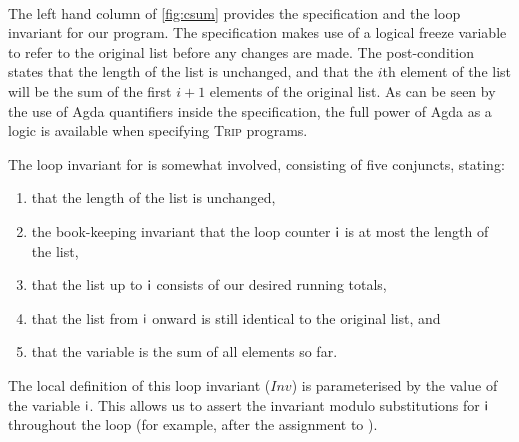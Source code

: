 \documentclass[sigplan]{acmart}%
\begin{document}
\begin{code}
\>[2]\AgdaOperator{\AgdaFunction{\AgdaUnderscore{}[\AgdaUnderscore{}]=\AgdaUnderscore{}}}\AgdaSpace{}%
\AgdaSymbol{:}\AgdaSpace{}%
\AgdaSpace{}%
\AgdaSpace{}%
\AgdaSpace{}%
\AgdaSpace{}%
\AgdaSpace{}%
\AgdaSpace{}%
\AgdaSpace{}%
\<%
\\
%
\>[2]\AgdaSpace{}%
\AgdaOperator{\AgdaFunction{[}}\AgdaSpace{}%
\AgdaSpace{}%
\AgdaOperator{\AgdaFunction{]=}}\AgdaSpace{}%
\AgdaSpace{}%
\AgdaSymbol{=}\AgdaSpace{}%
\AgdaSpace{}%
\AgdaSymbol{(}\AgdaSpace{}%
\AgdaOperator{\AgdaFunction{<}}\AgdaSpace{}%
\AgdaSpace{}%
\AgdaSymbol{)}\AgdaSpace{}%
\AgdaSpace{}%
\AgdaSpace{}%
\AgdaSpace{}%
\AgdaSymbol{(}\AgdaSpace{}%
\AgdaOperator{\AgdaFunction{!}}\AgdaSpace{}%
\AgdaSymbol{)}\AgdaSpace{}%
\AgdaSpace{}%
\<%
\end{code}
The left hand column of \autoref{fig:csum} provides 
the specification and the loop invariant for our program.
The specification makes use of a logical freeze variable 
to refer to the original list before any changes are made. 
The post-condition states that the length of the list is unchanged,
and that the $i$th element of the list will be the sum of the first $i + 1$
elements of the original list. As can be seen by the use of Agda quantifiers
inside the specification, the full power of Agda as a logic is available when 
specifying \textsc{Trip} programs.

The loop invariant for  is somewhat involved, consisting 
of five conjuncts, stating:
\begin{enumerate}
  \item that the length of the list is unchanged, 
  \item the book-keeping invariant that the loop counter $\AgdaField{i}$ is at most 
        the length of the list, 
  \item that the list up to $\AgdaField{i}$ consists of our desired running totals, 
  \item that the list from $\AgdaField{i}$ onward is still identical to the original list, and 
  \item that the variable  is the sum of all elements so far.
\end{enumerate}
The local definition of this loop invariant ($\mathit{Inv}$) is parameterised by the 
value of the variable $\AgdaField{i}$. This allows us to assert the invariant modulo substitutions
for $\AgdaField{i}$ throughout the loop (for example, after the assignment to ). 
\end{document}
